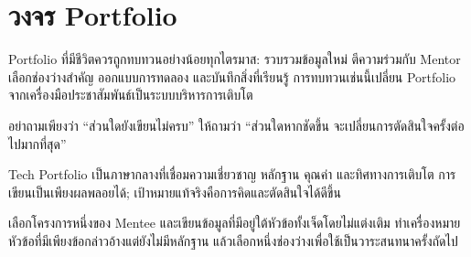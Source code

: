 \section{วงจร Portfolio}
Portfolio ที่มีชีวิตควรถูกทบทวนอย่างน้อยทุกไตรมาส: รวบรวมข้อมูลใหม่ ตีความร่วมกับ Mentor เลือกช่องว่างสำคัญ ออกแบบการทดลอง และบันทึกสิ่งที่เรียนรู้ การทบทวนเช่นนี้เปลี่ยน Portfolio จากเครื่องมือประชาสัมพันธ์เป็นระบบบริหารการเติบโต


\begin{mentornote}
อย่าถามเพียงว่า \enquote{ส่วนใดยังเขียนไม่ครบ} ให้ถามว่า \enquote{ส่วนใดหากชัดขึ้น จะเปลี่ยนการตัดสินใจครั้งต่อไปมากที่สุด}
\end{mentornote}

\begin{keytakeaway}
Tech Portfolio เป็นภาษากลางที่เชื่อมความเชี่ยวชาญ หลักฐาน คุณค่า และทิศทางการเติบโต การเขียนเป็นเพียงผลพลอยได้; เป้าหมายแท้จริงคือการคิดและตัดสินใจได้ดีขึ้น
\end{keytakeaway}

\begin{reflection}
เลือกโครงการหนึ่งของ Mentee และเขียนข้อมูลที่มีอยู่ใต้หัวข้อทั้งเจ็ดโดยไม่แต่งเติม ทำเครื่องหมายหัวข้อที่มีเพียงข้อกล่าวอ้างแต่ยังไม่มีหลักฐาน แล้วเลือกหนึ่งช่องว่างเพื่อใช้เป็นวาระสนทนาครั้งถัดไป
\blankline\blankline
\end{reflection}

